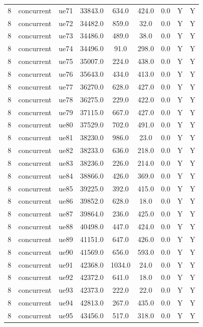 \begin{table}[ht]
\begin{tabular}{|c|c|c|c|c|c|c|c|c|}
8 & concurrent & ue71 & 33843.0 & 634.0 & 424.0 & 0.0 & Y & Y \\
8 & concurrent & ue72 & 34482.0 & 859.0 & 32.0 & 0.0 & Y & Y \\
8 & concurrent & ue73 & 34486.0 & 489.0 & 38.0 & 0.0 & Y & Y \\
8 & concurrent & ue74 & 34496.0 & 91.0 & 298.0 & 0.0 & Y & Y \\
8 & concurrent & ue75 & 35007.0 & 224.0 & 438.0 & 0.0 & Y & Y \\
8 & concurrent & ue76 & 35643.0 & 434.0 & 413.0 & 0.0 & Y & Y \\
8 & concurrent & ue77 & 36270.0 & 628.0 & 427.0 & 0.0 & Y & Y \\
8 & concurrent & ue78 & 36275.0 & 229.0 & 422.0 & 0.0 & Y & Y \\
8 & concurrent & ue79 & 37115.0 & 667.0 & 427.0 & 0.0 & Y & Y \\
8 & concurrent & ue80 & 37529.0 & 702.0 & 491.0 & 0.0 & Y & Y \\
8 & concurrent & ue81 & 38230.0 & 986.0 & 23.0 & 0.0 & Y & Y \\
8 & concurrent & ue82 & 38233.0 & 636.0 & 218.0 & 0.0 & Y & Y \\
8 & concurrent & ue83 & 38236.0 & 226.0 & 214.0 & 0.0 & Y & Y \\
8 & concurrent & ue84 & 38866.0 & 426.0 & 369.0 & 0.0 & Y & Y \\
8 & concurrent & ue85 & 39225.0 & 392.0 & 415.0 & 0.0 & Y & Y \\
8 & concurrent & ue86 & 39852.0 & 628.0 & 18.0 & 0.0 & Y & Y \\
8 & concurrent & ue87 & 39864.0 & 236.0 & 425.0 & 0.0 & Y & Y \\
8 & concurrent & ue88 & 40498.0 & 447.0 & 424.0 & 0.0 & Y & Y \\
8 & concurrent & ue89 & 41151.0 & 647.0 & 426.0 & 0.0 & Y & Y \\
8 & concurrent & ue90 & 41569.0 & 656.0 & 593.0 & 0.0 & Y & Y \\
8 & concurrent & ue91 & 42368.0 & 1034.0 & 24.0 & 0.0 & Y & Y \\
8 & concurrent & ue92 & 42372.0 & 641.0 & 18.0 & 0.0 & Y & Y \\
8 & concurrent & ue93 & 42373.0 & 222.0 & 22.0 & 0.0 & Y & Y \\
8 & concurrent & ue94 & 42813.0 & 267.0 & 435.0 & 0.0 & Y & Y \\
8 & concurrent & ue95 & 43456.0 & 517.0 & 318.0 & 0.0 & Y & Y \\

\end{tabular}
\end{table}
